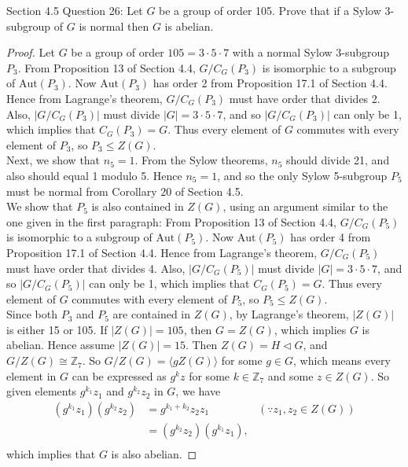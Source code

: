Section 4.5 Question 26: Let $G$ be a group of order 105. Prove that if a
Sylow 3-subgroup of $G$ is normal then $G$ is abelian.

\begin{proof}
  Let $G$ be a group of order $105=3\cdot5\cdot7$ with a normal Sylow
  3-subgroup $P_3$. From Proposition 13 of Section 4.4, $G/C_G(P_3)$ is
  isomorphic to a subgroup of $\text{Aut}(P_3)$. Now $\text{Aut}(P_3)$ has
  order 2 from Proposition 17.1 of Section 4.4. Hence from Lagrange's
  theorem, $G/C_G(P_3)$ must have order that divides 2. Also, $|G/C_G(P_3)|$
  must divide $|G|=3\cdot5\cdot7$, and so $|G/C_G(P_3)|$ can only be 1, which
  implies that $C_G(P_3)=G$. Thus every element of $G$ commutes with every
  element of $P_3$, so $P_3\leq Z(G)$. \\

  Next, we show that $n_5=1$. From the Sylow theorems, $n_5$ should divide
  21, and also should equal 1 modulo 5. Hence $n_5=1$, and so the only
  Sylow 5-subgroup $P_5$ must be normal from Corollary 20 of Section 4.5.
  \\

  We show that $P_5$ is also contained in $Z(G)$, using an argument similar
  to the one given in the first paragraph: From Proposition 13 of Section
  4.4, $G/C_G(P_5)$ is isomorphic to a subgroup of $\text{Aut}(P_5)$. Now
  $\text{Aut}(P_5)$ has order 4 from Proposition 17.1 of Section 4.4. Hence
  from Lagrange's theorem, $G/C_G(P_5)$ must have order that divides 4.
  Also, $|G/C_G(P_5)|$ must divide $|G|=3\cdot5\cdot7$, and so
  $|G/C_G(P_5)|$ can only be 1, which implies that $C_G(P_5)=G$. Thus every
  element of $G$ commutes with every element of $P_5$, so $P_5\leq Z(G)$.
  \\

  Since both $P_3$ and $P_5$ are contained in $Z(G)$, by Lagrange's
  theorem, $|Z(G)|$ is either 15 or 105. If $|Z(G)|=105$, then $G=Z(G)$,
  which implies $G$ is abelian. Hence assume $|Z(G)|=15$.
  Then $Z(G)=H\triangleleft G$, and $G/Z(G)\cong\mathbb{Z}_{7}$. So
  $G/Z(G)=\langle gZ(G)\rangle$ for some $g\in G$, which means every
  element in $G$ can be expressed as $g^kz$ for some $k\in\mathbb{Z}_{7}$
  and some $z\in Z(G)$. So given elements $g^{k_1}z_1$ and $g^{k_2}z_2$ in
  $G$, we have
  \begin{align*}
    (g^{k_1}z_1)(g^{k_2}z_2)  &= g^{k_1+k_2}z_2z_1  & (\because z_1,z_2\in
      Z(G)) \\
                              &= (g^{k_2}z_2)(g^{k_1}z_1),  & \\
  \end{align*}
  which implies that $G$ is also abelian.
\end{proof}
